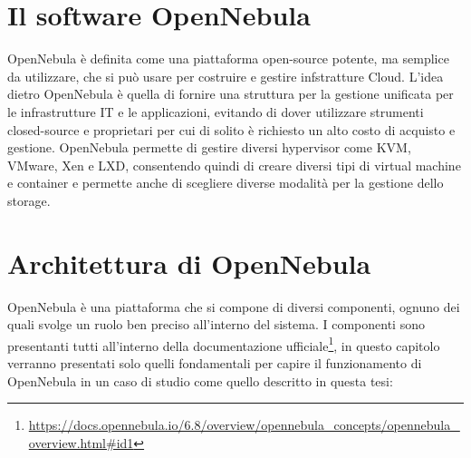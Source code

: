 \section{Il software OpenNebula}
OpenNebula\cite{opennebula} è definita come una piattaforma open-source potente, ma semplice da utilizzare, che si può usare per costruire e gestire infstratture Cloud. L'idea dietro OpenNebula è quella di fornire una struttura per la gestione unificata per le infrastrutture IT e le applicazioni, evitando di dover utilizzare strumenti closed-source e proprietari per cui di solito è richiesto un alto costo di acquisto e gestione.\medbreak
OpenNebula permette di gestire diversi hypervisor come KVM, VMware, Xen e LXD, consentendo quindi di creare diversi tipi di virtual machine e container e permette anche di scegliere diverse modalità per la gestione dello storage.
\section{Architettura di OpenNebula}
OpenNebula è una piattaforma che si compone di diversi componenti, ognuno dei quali svolge un ruolo ben preciso all'interno del sistema. I componenti sono presentanti tutti all'interno della documentazione ufficiale\footnote{\url{https://docs.opennebula.io/6.8/overview/opennebula\_concepts/opennebula\_overview.html\#id1}}, in questo capitolo verranno presentati solo quelli fondamentali per capire il funzionamento di OpenNebula in un caso di studio come quello descritto in questa tesi:
